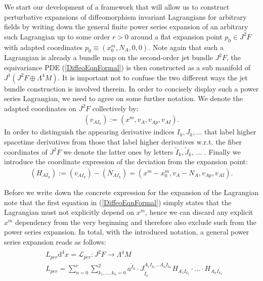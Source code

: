 We start our development of a framework that will allow us to construct perturbative expansions of diffeomorphism invariant Lagrangians for arbitrary fields by writing down the general finite power series expansion of an arbitrary such Lagrangian up to some order $r > 0$ around a flat expansion point $p_0 \in J^2F$ with adapted coordinates $p_0 \equiv (x_0^m,N_A, 0, 0)$. Note again that such a Lagrangian is already a bundle map on the second-order jet bundle $J^2F$, the equivariance PDE (\ref{DiffeoEqnFormal}) is then constructed as a sub manifold of $J^1(J^2F \oplus \Lambda^4M)$. It is important not to confuse the two different ways the jet bundle construction is involved therein. In order to concisely display such a power series Lagrangian, we need to agree on some further notation. We denote the adapted coordinates on $J^2F$ collectively by:
\begin{align}
    (v_{AI_k}) := (x^m,v_A,v_{Ap},v_{AI}).
\end{align}
In order to distinguish the appearing derivative indices $I_k,J_k,...$ that label higher spacetime derivatives from those that label higher derivatives w.r.t. the fiber coordinates of $J^2F$ we denote the latter ones by letters
$\tilde{I}_k, \tilde{J}_k$, ... . Finally we introduce the coordinate expression of the deviation from the expansion point: 
\begin{align}
    (H_{AI_k}) := (v_{AI_k}) - (N_{AI_k}) = (x^m-x_0^m,v_A-N_A,v_{Ap},v_{AI}).
\end{align}

Before we write down the concrete expression for the expansion of the Lagrangian note that the first equation in (\ref{DiffeoEqnFormal}) simply states that the Lagrangian must not explicitly depend on $x^m$, hence we can discard any explicit $x^m$ dependency from the very beginning and therefore also exclude such from the power series expansion. In total, with the introduced notation, a general power series expansion reads as follows: 
\begin{align} \label{generalPowerSL}
    \begin{aligned}
    &L_{per}  \mathrm{d}^4x = \mathcal{L}_{per} : J^2F \longrightarrow \Lambda^4M \\
    &L_{per} = \sum_{n=0}^r \sum_{k_1,...,k_n = 0}^2 a^{\tilde{I}_k} \cdot J_{\tilde{I}_k}^{A_1I_{k_1}...A_nI_{k_n}} H_{A_1I_{k_1}} \cdot ... \cdot H_{A_nI_{k_n}}
    \end{aligned}
\end{align}

